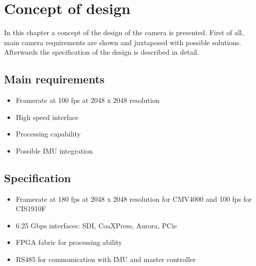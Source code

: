 \chapter{Concept of design}
In this chapter a concept of the design of the camera is presented. First of all, main camera requirements are shown and juxtaposed with possible solutions. Afterwards the specification of the design is described in detail.

\section{Main requirements}

\begin{itemize}
\item Framerate at 100 fps at 2048 x 2048 resolution
\item High speed interface 
\item Processing capability
\item Possible IMU integration
\end{itemize}

\section{Specification}

\begin{itemize}
\item Framerate at 180 fps at 2048 x 2048 resolution
for CMV4000 and 100 fps for CIS1910F
\item 6.25 Gbps interfaces: SDI, CoaXPress, Aurora, PCie
\item FPGA fabric for processing ability
\item RS485 for communication with IMU and master controller

\end{itemize}
